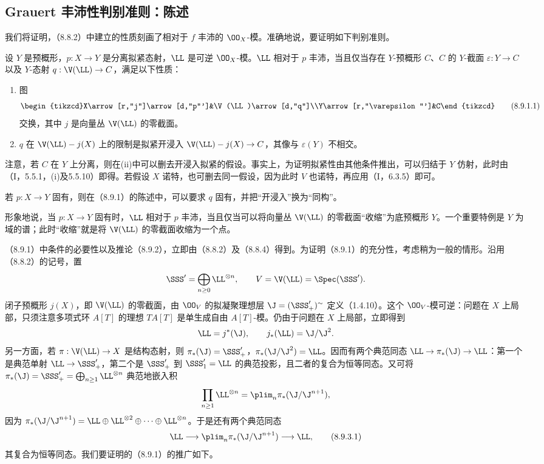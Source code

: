 \subsection{Grauert 丰沛性判别准则：陈述}
我们将证明，（8.8.2）中建立的性质刻画了相对于 $f$ 丰沛的 $\OO_X$-模。准确地说，要证明如下判别准则。

 设 $Y$ 是预概形，$p:X\to Y$ 是分离拟紧态射，$\LL$ 是可逆 $\OO_X$-模。$\LL$ 相对于 $p$ 丰沛，当且仅当存在 $Y$-预概形 $C$、$C$ 的 $Y$-截面 $\varepsilon:Y\to C$ 以及 $Y$-态射 $q:\V(\LL)\to C$，满足以下性质：
\begin{enumerate}[label=(\roman*)]
\item 图
\begin{equation}\begin{tikzcd}X\arrow[r,"j"]\arrow[d,"p"']&\V(\LL)\arrow[d,"q"]\\Y\arrow[r,"\varepsilon"']&C\end{tikzcd}\tag{8.9.1.1}\end{equation}
交换，其中 $j$ 是向量丛 $\V(\LL)$ 的零截面。
\item $q$ 在 $\V(\LL)-j(X)$ 上的限制是拟紧开浸入 $\V(\LL)-j(X)\to C$，其像与 $\varepsilon(Y)$ 不相交。
\end{enumerate}
注意，若 $C$ 在 $Y$ 上分离，则在(ii)中可以删去开浸入拟紧的假设。事实上，为证明拟紧性由其他条件推出，可以归结于 $Y$ 仿射，此时由（I，5.5.1，(i)及5.5.10）即得。若假设 $X$ 诺特，也可删去同一假设，因为此时 $V$ 也诺特，再应用（I，6.3.5）即可。

 若 $p:X\to Y$ 固有，则在（8.9.1）的陈述中，可以要求 $q$ 固有，并把“开浸入”换为“同构”。

形象地说，当 $p:X\to Y$ 固有时，$\LL$ 相对于 $p$ 丰沛，当且仅当可以将向量丛 $\V(\LL)$ 的零截面“收缩”为底预概形 $Y$。一个重要特例是 $Y$ 为域的谱；此时“收缩”就是将 $\V(\LL)$ 的零截面收缩为一个点。

 （8.9.1）中条件的必要性以及推论（8.9.2），立即由（8.8.2）及（8.8.4）得到。为证明（8.9.1）的充分性，考虑稍为一般的情形。沿用（8.8.2）的记号，置
\[\SSS'=\bigoplus_{n\geq0}\LL^{\otimes n},\qquad V=\V(\LL)=\Spec(\SSS').\]
闭子预概形 $j(X)$，即 $\V(\LL)$ 的零截面，由 $\OO_V$ 的拟凝聚理想层 $\J=(\SSS'_+)^{\sim}$ 定义（1.4.10）。这个 $\OO_V$-模可逆：问题在 $X$ 上局部，只须注意多项式环 $A[T]$ 的理想 $TA[T]$ 是单生成自由 $A[T]$-模。仍由于问题在 $X$ 上局部，立即得到
\[\LL=j^*(\J),\qquad j_*(\LL)=\J/\J^2.\]
另一方面，若 $\pi:\V(\LL)\to X$ 是结构态射，则 $\pi_*(\J)=\SSS'_+$，$\pi_*(\J/\J^2)=\LL$。因而有两个典范同态 $\LL\to\pi_*(\J)\to\LL$：第一个是典范单射 $\LL\to\SSS'_+$，第二个是 $\SSS'_+$ 到 $\SSS'_1=\LL$ 的典范投影，且二者的复合为恒等同态。又可将 $\pi_*(\J)=\SSS'_+=\bigoplus_{n\geq1}\LL^{\otimes n}$ 典范地嵌入积
\[\prod_{n\geq1}\LL^{\otimes n}=\plim_n\pi_*(\J/\J^{n+1}),\]
因为 $\pi_*(\J/\J^{n+1})=\LL\oplus\LL^{\otimes2}\oplus\cdots\oplus\LL^{\otimes n}$。于是还有两个典范同态
\begin{equation}\LL\longrightarrow\plim_n\pi_*(\J/\J^{n+1})\longrightarrow\LL,\tag{8.9.3.1}\end{equation}
其复合为恒等同态。我们要证明的（8.9.1）的推广如下。

